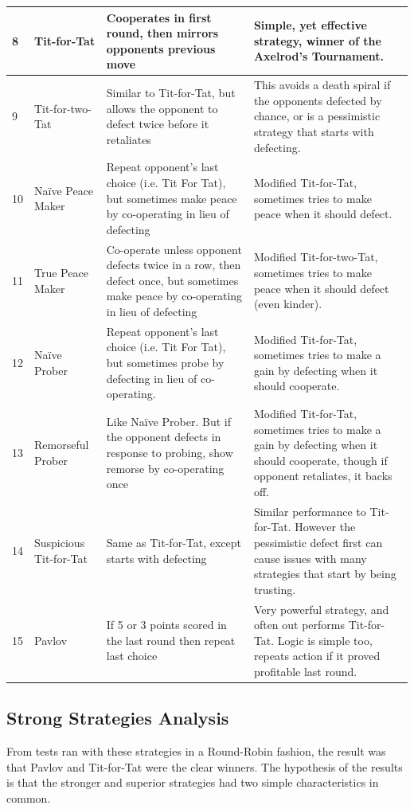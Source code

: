 \documentclass{icldt}
\numberwithin{equation}{section}       %
\begin{document}
\begin{center}
    \begin{tabular}{ | l | p{2.5cm} | p{4cm} | p{6cm} |}
    \hline
    8	& Tit-for-Tat	& Cooperates in first round, then mirrors opponents previous move	& Simple, yet effective strategy, winner of the Axelrod's Tournament.\\ \hline
9	& Tit-for-two-Tat	& Similar to Tit-for-Tat, but allows the opponent to defect twice before it retaliates	& This avoids a death spiral if the opponents defected by chance, or is a pessimistic strategy that starts with defecting.\\ \hline
10	& Naïve Peace Maker	& Repeat opponent's last choice (i.e. Tit For Tat), but sometimes make peace by co-operating in lieu of defecting	& Modified Tit-for-Tat, sometimes tries to make peace when it should defect.\\ \hline
11	& True Peace Maker	& Co-operate unless opponent defects twice in a row, then defect once, but sometimes make peace by co-operating in lieu of defecting	& Modified Tit-for-two-Tat, sometimes tries to make peace when it should defect (even kinder).\\ \hline
12	& Naïve Prober & Repeat opponent's last choice (i.e. Tit For Tat), but sometimes probe by defecting in lieu of co-operating.	& Modified Tit-for-Tat, sometimes tries to make a gain by defecting when it should cooperate.\\ \hline
13	& Remorseful Prober	& Like Naïve Prober. But if the opponent defects in response to probing, show remorse by co-operating once & Modified Tit-for-Tat, sometimes tries to make a gain by defecting when it should cooperate, though if opponent retaliates, it backs off.\\ \hline
14 & Suspicious Tit-for-Tat & Same as Tit-for-Tat, except starts with defecting & Similar performance to Tit-for-Tat. However the pessimistic defect first can cause issues with many strategies that start by being trusting.\\ \hline
15 & Pavlov & If 5 or 3 points scored in the last round then repeat last choice & Very powerful strategy, and often out performs Tit-for-Tat. Logic is simple too, repeats action if it proved profitable last round.\\ \hline
    \end{tabular}
\end{center}

\subsection{Strong Strategies Analysis}
\label{sect:Strong Strategies Analysis}
From tests ran with these strategies in a Round-Robin fashion, the result was that Pavlov and Tit-for-Tat were the clear winners. The hypothesis of the results is that the stronger and superior strategies had two simple characteristics in common. 
\end{document}
